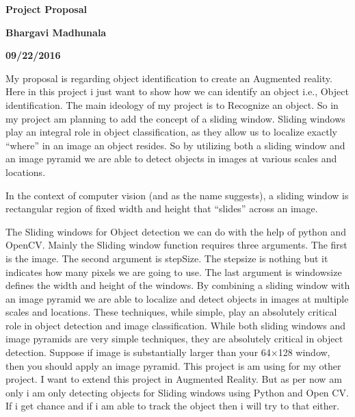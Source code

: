 \documentclass[12pt]{article}
\begin{document}
\begin{titlepage}
\begin{center}
\vspace*{1cm}
\textbf{Project Proposal}
\vspace{0.5cm}

\textbf{Bhargavi Madhunala}
\vspace{0.5cm}

\textbf{09/22/2016}
\end{center}
\end{titlepage}
My proposal is regarding object identification to create an Augmented reality. Here in this project i just want to show how we can identify an object i.e., Object identification. The main ideology of my project is to Recognize an object. So in my project am planning to add the concept of a sliding window. Sliding windows play an integral role in object classification, as they allow us to localize exactly “where” in an image an object resides. So by utilizing both a sliding window and an image pyramid we are able to detect objects in images at various scales and locations. 

In the context of computer vision (and as the name suggests), a sliding window is rectangular region of fixed width and height that “slides” across an image. 

The Sliding windows for Object detection we can do with the help of python and OpenCV. 
Mainly the Sliding window function requires three arguments. 
The first is the image. The second argument is stepSize. The stepsize is nothing but it indicates how many pixels we are going to use. The last argument is windowsize defines the width and height of the windows. 
By combining a sliding window with an image pyramid we are able to localize and detect objects in images at multiple scales and locations.
These techniques, while simple, play an absolutely critical role in object detection and image classification.
While both sliding windows and image pyramids are very simple techniques, they are absolutely critical in object detection.
Suppose if image is substantially larger than your 64×128 window, then you should apply an image pyramid. 
This project is am using for my other project. I want to extend this project in Augmented Reality. But as per now am only i am only detecting objects for Sliding windows using Python and Open CV. If i get chance and if i am able to track the object then i will try to that either.
\end{document}
